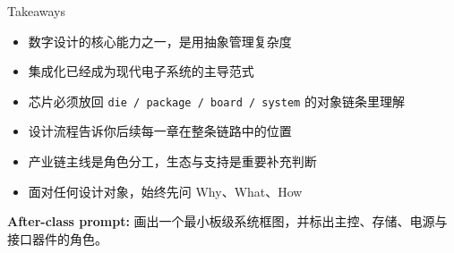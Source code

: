 \documentclass[aspectratio=169]{beamer}
\begin{document}
\begin{frame}{Takeaways}
\begin{itemize}
  \item 数字设计的核心能力之一，是用抽象管理复杂度
  \item 集成化已经成为现代电子系统的主导范式
  \item 芯片必须放回 \texttt{die / package / board / system} 的对象链条里理解
  \item 设计流程告诉你后续每一章在整条链路中的位置
  \item 产业链主线是角色分工，生态与支持是重要补充判断
  \item 面对任何设计对象，始终先问 Why、What、How
\end{itemize}

\vspace{0.7em}
\textbf{After-class prompt:} 画出一个最小板级系统框图，并标出主控、存储、电源与接口器件的角色。
\end{frame}
\end{document}
